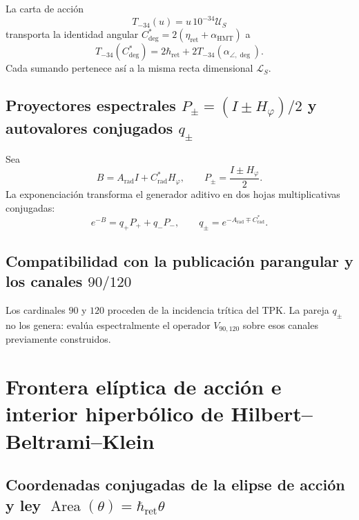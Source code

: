 La carta de acción
\begin{equation}
 T_{-34}(u)=u\,10^{-34}\mathcal U_S
 \label{eq:l9s102:euler-t34}
\end{equation}
transporta la identidad angular
\(C^*_{\deg}=2(\eta_{\mathrm{ret}}+\alpha_{\mathrm{HMT}})\) a
\begin{equation}
 \boxed{
 T_{-34}(C^*_{\deg})
 =2\hbar_{\mathrm{ret}}
 +2T_{-34}(\alpha_{\angle,\deg}).}
 \label{eq:l9s102:euler-cstar-hbar}
\end{equation}
Cada sumando pertenece así a la misma recta dimensional
\(\mathcal L_S\).

\subsection{Proyectores espectrales \texorpdfstring{\(P_\pm=(I\pm H_\varphi)/2\)}{P+/-=(I+/-H_phi)/2} y autovalores conjugados \texorpdfstring{\(q_\pm\)}{q+/-}}

Sea
\begin{equation}
 B=A_{\mathrm{rad}}I+C^*_{\mathrm{rad}}H_\varphi,
 \qquad
 P_\pm=\frac{I\pm H_\varphi}{2}.
 \label{eq:l9s102:euler-b}
\end{equation}
La exponenciación transforma el generador aditivo en dos hojas
multiplicativas conjugadas:
\begin{equation}
 \boxed{
 e^{-B}=q_+P_++q_-P_-,
 \qquad
 q_\pm=e^{-A_{\mathrm{rad}}\mp C^*_{\mathrm{rad}}}.}
 \label{eq:l9s102:euler-exp-b}
\end{equation}

\subsection{Compatibilidad con la publicación parangular y los canales \texorpdfstring{\(90/120\)}{90/120}}

Los cardinales \(90\) y \(120\) proceden de la incidencia trítica del TPK.
La pareja \(q_\pm\) no los genera: evalúa espectralmente el operador
\(V_{90,120}\) sobre esos canales previamente construidos.

\section{Frontera elíptica de acción e interior hiperbólico de Hilbert--Beltrami--Klein}
\label{sec:l9s102:euler-elipse-klein}

\subsection{Coordenadas conjugadas de la elipse de acción y ley \texorpdfstring{\(\operatorname{Area}(\theta)=\hbar_{\mathrm{ret}}\theta\)}{Area(theta)=hbar_ret theta}}

